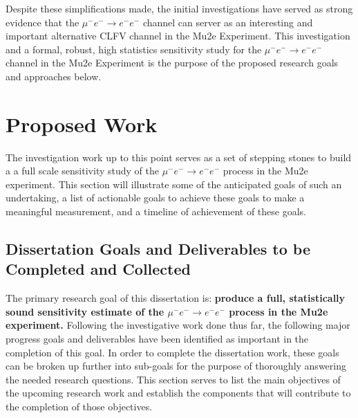 \documentclass[12pt]{article}
\newcommand{\muEtoEE}{\mu^- e^- \to e^- e^-}
\begin{document}
Despite these simplifications made, the initial investigations have served as strong evidence that the $\muEtoEE$ channel can server as an interesting and important alternative CLFV channel in the Mu2e Experiment. This investigation and a formal, robust, high statistics sensitivity study for the $\muEtoEE$ channel in the Mu2e Experiment is the purpose of the proposed research goals and approaches below.

\section{Proposed Work}\label{sec:Proposal}

The investigation work up to this point serves as a set of stepping stones to build a a full scale sensitivity study of the $\muEtoEE$ process in the Mu2e experiment. This section will illustrate some of the anticipated goals of such an undertaking, a list of actionable goals to achieve these goals to make a meaningful measurement, and a timeline of achievement of these goals.

\subsection{Dissertation Goals and Deliverables to be Completed and Collected} \label{subsec:Goals}

The primary research goal of this dissertation is: \textbf{produce a full, statistically sound sensitivity estimate of the $\muEtoEE$ process in the Mu2e experiment.} Following the investigative work done thus far, the following major progress goals and deliverables have been identified as important in the completion of this goal. In order to complete the dissertation work, these goals  can be broken up further into sub-goals for the purpose of thoroughly answering the needed research questions. This section serves to list the main objectives of the upcoming research work and establish the components that will contribute to the completion of those objectives.
\end{document}
